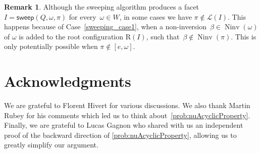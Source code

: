\documentclass[reqno]{amsart}
\theoremstyle{definition}
\newtheorem{remark}[theorem]{Remark}
\DeclareMathOperator{\Ninv}{Ninv} %
\newcommand{\linearExtensions}{\mathcal{L}} %
\newcommand{\Roots}{\mathrm{R}} %
\newcommand{\sweepingAlgorithm}{\mathsf{sweep}} %
\begin{document}
\begin{remark}
    Although the sweeping algorithm produces a facet $I=\sweepingAlgorithm(Q,\omega,\pi)$ for every~${\omega\in W}$, in some cases we have $\pi \notin \linearExtensions(I)$. 
    This happens because of Case~\eqref{sweeping_case1}, when a non-inversion~$\beta\in \Ninv(\omega)$ of $\omega$ is added to the root configuration $\Roots(I)$, such that~$\beta \notin \Ninv(\pi)$. This is only potentially possible when $\pi \notin [e,\omega]$.
\end{remark}


\section*{Acknowledgments}

We are grateful to Florent Hivert for various discussions. We also thank Martin Rubey for his comments which led us to think about~\cref{prob:nuAcyclicProperty}.
Finally, we are grateful to Lucas Gagnon who shared with us an independent proof of the backward direction of \cref{prob:nuAcyclicProperty}, allowing us to greatly simplify our argument.




\label{sec:biblio}

\end{document}
